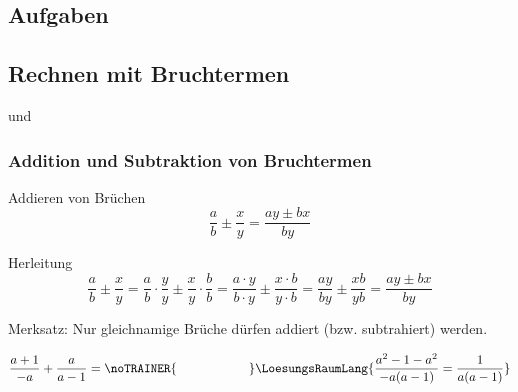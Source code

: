 \subsection*{Aufgaben}
%

%



\newpage
\subsection{Rechnen mit Bruchtermen}
 und  

\subsubsection{Addition und Subtraktion von Bruchtermen}

\begin{gesetz}{Addieren von Brüchen}{}
$$\frac{a}{b}\pm\frac{x}{y} = \frac{ay\pm{}bx}{by}$$
\end{gesetz}

Herleitung
$$\frac{a}{b}\pm\frac{x}{y} = \frac{a}{b}\cdot\frac{y}{y} \pm \frac{x}{y}\cdot\frac{b}{b} =
\frac{a\cdot y}{b\cdot y}\pm \frac{x\cdot b}{y \cdot b} = \frac{ay}{by}\pm\frac{xb}{yb} = \frac{ay\pm{}bx}{by}$$


\begin{gesetz}{}{}
Merksatz: Nur gleichnamige Brüche dürfen addiert (bzw. subtrahiert)
werden.
\end{gesetz}

\begin{beispiel}{}{}
$$\frac{a+1}{-a} + \frac{a}{a-1} = \noTRAINER{\hspace{2cm}}\LoesungsRaumLang{ \frac{a^2 - 1 - a^2}{-a(a-1)} = \frac{1}{a(a-1)}}$$
\end{beispiel}

\TNTeop{}%
\newpage


